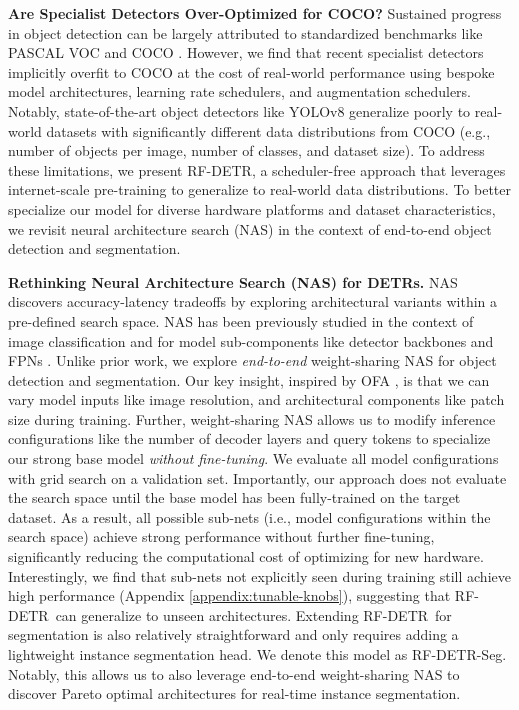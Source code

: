 \documentclass{article} %
\newcommand{\method}{RF-DETR}
\begin{document}
\textbf{Are Specialist Detectors Over-Optimized for COCO?} Sustained progress in object detection can be largely attributed to standardized benchmarks like PASCAL VOC \citep{pascalvoc} and COCO \citep{lin2014coco}. However, we find that recent specialist detectors implicitly overfit to COCO at the cost of real-world performance using bespoke model architectures, learning rate schedulers, and augmentation schedulers. Notably, state-of-the-art object detectors like YOLOv8 \citep{yolov8} generalize poorly to real-world datasets with significantly different data distributions from COCO (e.g., number of objects per image, number of classes, and dataset size). To address these limitations, we present \method, a scheduler-free approach that leverages internet-scale pre-training to generalize to real-world data distributions. To better specialize our model for diverse hardware platforms and dataset characteristics, we revisit neural architecture search (NAS) in the context of end-to-end object detection and segmentation.

\textbf{Rethinking Neural Architecture Search (NAS) for DETRs.} NAS discovers accuracy-latency tradeoffs by exploring architectural variants within a pre-defined search space. NAS has been previously studied in the context of image classification \citep{tan2019efficientnet, cai2019ofa} and for model sub-components like detector backbones \cite{tan2020efficientdet} and FPNs \cite{ghiasi2019fpn}. Unlike prior work, we explore \textit{end-to-end} weight-sharing NAS for object detection and segmentation. Our key insight, inspired by OFA \citep{cai2019ofa}, is that we can vary model inputs like image resolution, and architectural components like patch size during training. Further, weight-sharing NAS allows us to modify inference configurations like the number of decoder layers and query tokens to specialize our strong base model \textit{without fine-tuning}. We evaluate all model configurations with grid search on a validation set. Importantly, our approach does not evaluate the search space until the base model has been fully-trained on the target dataset. As a result, all possible sub-nets (i.e., model configurations within the search space) achieve strong performance without further fine-tuning, significantly reducing the computational cost of optimizing for new hardware. Interestingly, we find that sub-nets not explicitly seen during training still achieve high performance (Appendix \ref{appendix:tunable-knobs}), suggesting that \method \ can generalize to unseen architectures. Extending \method \ for segmentation is also relatively straightforward and only requires adding a lightweight instance segmentation head. We denote this model as \method-Seg. Notably, this allows us to also leverage end-to-end weight-sharing NAS to discover Pareto optimal architectures for real-time instance segmentation.
\end{document}
